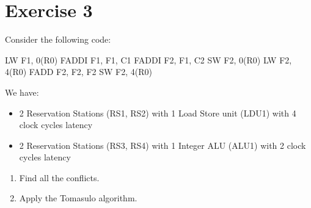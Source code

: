 \section{Exercise 3}

Consider the following code: 
\begin{verbnobox}[\verbarg]
LW F1, 0(R0)
FADDI F1, F1, C1
FADDI F2, F1, C2
SW F2, 0(R0)
LW F2, 4(R0)
FADD F2, F2, F2
SW F2, 4(R0)
\end{verbnobox}
We have: 
\begin{itemize}
    \item 2 Reservation Stations (RS1, RS2) with 1 Load Store unit (LDU1) with 4 clock cycles latency
    \item 2 Reservation Stations (RS3, RS4) with 1 Integer ALU (ALU1) with 2 clock cycles latency
\end{itemize}
\begin{enumerate}
    \item Find all the conflicts. 
    \item Apply the Tomasulo algorithm. 
\end{enumerate}


